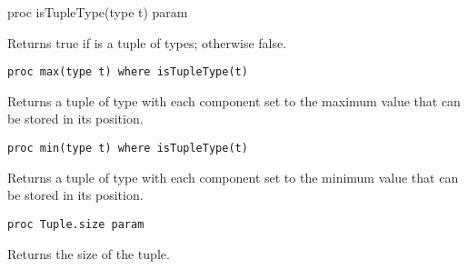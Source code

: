 \begin{protohead}
proc isTupleType(type t) param
\end{protohead}
\begin{protobody}
Returns true if  is a tuple of types; otherwise false.
\end{protobody}

\begin{protohead}
\begin{verbatim}
proc max(type t) where isTupleType(t)
\end{verbatim}
\end{protohead}
\begin{protobody}
Returns a tuple of type  with each component set to the maximum
value that can be stored in its position.
\end{protobody}

\begin{protohead}
\begin{verbatim}
proc min(type t) where isTupleType(t)
\end{verbatim}
\end{protohead}
\begin{protobody}
Returns a tuple of type  with each component set to the minimum
value that can be stored in its position.
\end{protobody}

\begin{protohead}
\begin{verbatim}
proc Tuple.size param
\end{verbatim}
\end{protohead}
\begin{protobody}
Returns the size of the tuple.
\end{protobody}
